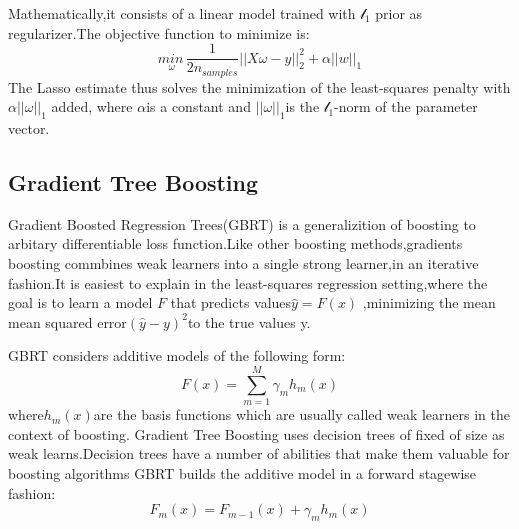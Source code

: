 \documentclass[10pt,a4paper]{ctexart}
\begin{document}
    Mathematically,it consists of a linear model trained with $\mathcal{l}_1$ prior as regularizer.The objective function to minimize is:
    \begin{equation*}
    	\underset{\omega}{min\,}{\dfrac{1}{2n_{samples}}||X\omega-y||_2^2}+\alpha||w||_1
    \end{equation*}
    The Lasso estimate thus solves the minimization of the least-squares penalty with $\alpha||\omega||_1$ added,
    where $\alpha$is a constant and $||\omega||_1$is the $\mathcal{l}_1$-norm of the parameter vector.
    \subsection{Gradient Tree Boosting}
    Gradient Boosted Regression Trees(GBRT) is a generalizition of boosting to arbitary
    differentiable loss function.Like other boosting methods,gradients boosting commbines weak learners into a single strong learner,in an iterative
    fashion.It is easiest to explain in the least-squares regression setting,where the goal is to learn a model $F$ that predicts values$\hat{y}=F(x)$
    ,minimizing the mean mean squared error$(\hat{y}-y)^2$to the true values y.
    
    GBRT considers additive models of the following form:
    \begin{equation*}
        F(x)=\sum_{m=1}^{M}\gamma_{m}h_m(x)
    \end{equation*}
    where$h_m(x)$are the basis functions which are usually called weak learners in the context of boosting.
    Gradient Tree Boosting uses decision trees of fixed of size as weak learns.Decision trees have a number of 
    abilities that make them valuable for boosting algorithms GBRT builds the additive model in a forward stagewise fashion:
    \begin{equation*}
        F_m(x)=F_{m-1}(x)+\gamma_mh_m(x)
    \end{equation*}
\end{document}

